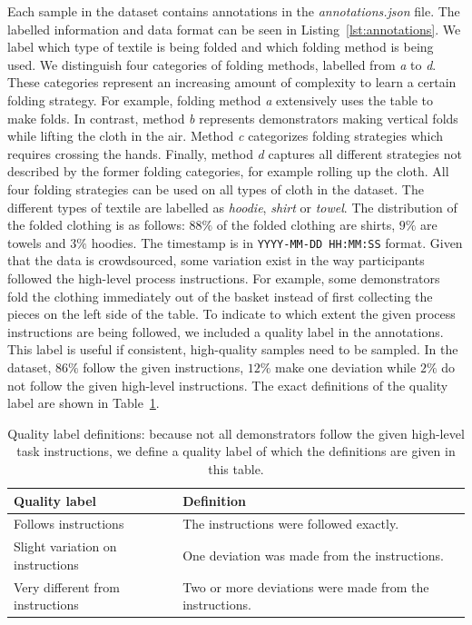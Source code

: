 \documentclass[\home/main.tex]{subfiles}
\begin{document}
Each sample in the dataset contains annotations in the \textit{annotations.json} file. The labelled information and data format can be seen in Listing~\ref{lst:annotations}. We label which type of textile is being folded and which folding method is being used. We distinguish four categories of folding methods, labelled from \textit{a} to \textit{d}. These categories represent an increasing amount of complexity to learn a certain folding strategy. For example, folding method \textit{a} extensively uses the table to make folds. In contrast, method \textit{b} represents demonstrators making vertical folds while lifting the cloth in the air. Method \textit{c} categorizes folding strategies which requires crossing the hands. Finally, method \textit{d} captures all different strategies not described by the former folding categories, for example rolling up the cloth. All four folding strategies can be used on all types of cloth in the dataset. The different types of textile are labelled as \textit{hoodie}, \textit{shirt} or \textit{towel}. The distribution of the folded clothing is as follows: $88\%$ of the folded clothing are shirts, $9\%$ are towels and $3\%$ hoodies. The timestamp is in \texttt{YYYY-MM-DD HH:MM:SS} format. Given that the data is crowdsourced, some variation exist in the way participants followed the high-level process instructions. For example, some demonstrators fold the clothing immediately out of the basket instead of first collecting the pieces on the left side of the table. To indicate to which extent the given process instructions are being followed, we included a quality label in the annotations. This label is useful if consistent, high-quality samples need to be sampled. In the dataset, $86\%$ follow the given instructions, $12\%$ make one deviation while $2\%$ do not follow the given high-level instructions. The exact definitions of the quality label are shown in Table~\ref{table:quality_def}.

\begin{table}
    \centering
    \begin{tabular}{@{} p{} p{} @{}}
        \toprule
        Quality label                    & Definition                                              \\
        \midrule
        Follows instructions             & The instructions were followed exactly.                 \\
        Slight variation on instructions & One deviation was made from the instructions.           \\
        Very different from instructions & Two or more deviations were made from the instructions. \\
        \bottomrule
    \end{tabular}
    \caption[Quality label definitions.]{Quality label definitions: because not all demonstrators follow the given high-level task instructions, we define a quality label of which the definitions are given in this table.}
    \label{table:quality_def}
\end{table}
\end{document}
